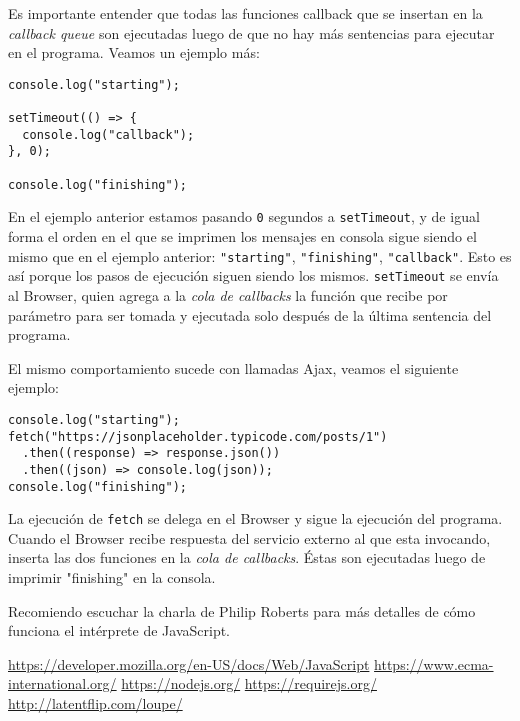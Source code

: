 \documentclass[a4paper, oneside, titlepage, 12pt]{paper}
\begin{document}
Es importante entender que todas las funciones callback que se insertan en la \textit{callback queue} son ejecutadas luego de que no hay más sentencias para ejecutar en el programa. Veamos un ejemplo más:

\begin{verbatim}
console.log("starting");

setTimeout(() => {
  console.log("callback");
}, 0);

console.log("finishing");
\end{verbatim}

En el ejemplo anterior estamos pasando \texttt{0} segundos a \texttt{setTimeout}, y de igual forma el orden en el que se imprimen los mensajes en consola sigue siendo el mismo que en el ejemplo anterior: \texttt{"starting"}, \texttt{"finishing"}, \texttt{"callback"}. Esto es así porque los pasos de ejecución siguen siendo los mismos. \texttt{setTimeout} se envía al Browser, quien agrega a la \textit{cola de callbacks} la función que recibe por parámetro para ser tomada y ejecutada solo después de la última sentencia del programa.
\newline

El mismo comportamiento sucede con llamadas Ajax, veamos el siguiente ejemplo:

\begin{verbatim}
console.log("starting");
fetch("https://jsonplaceholder.typicode.com/posts/1")
  .then((response) => response.json())
  .then((json) => console.log(json));
console.log("finishing");
\end{verbatim}

La ejecución de \texttt{fetch} se delega en el Browser y sigue la ejecución del programa. Cuando el Browser recibe respuesta del servicio externo al que esta invocando, inserta las dos funciones en la \textit{cola de callbacks}. Éstas son ejecutadas luego de imprimir "finishing" en la consola.
\newline

Recomiendo escuchar la charla de Philip Roberts\cite{loupe} para más detalles de cómo funciona el intérprete de JavaScript.


\begin{thebibliography}{100} %
 \url{https://developer.mozilla.org/en-US/docs/Web/JavaScript}
 \url{https://www.ecma-international.org/}
 \url{https://nodejs.org/}
 \url{https://requirejs.org/}
 \url{http://latentflip.com/loupe/}
\end{thebibliography}
\end{document}
